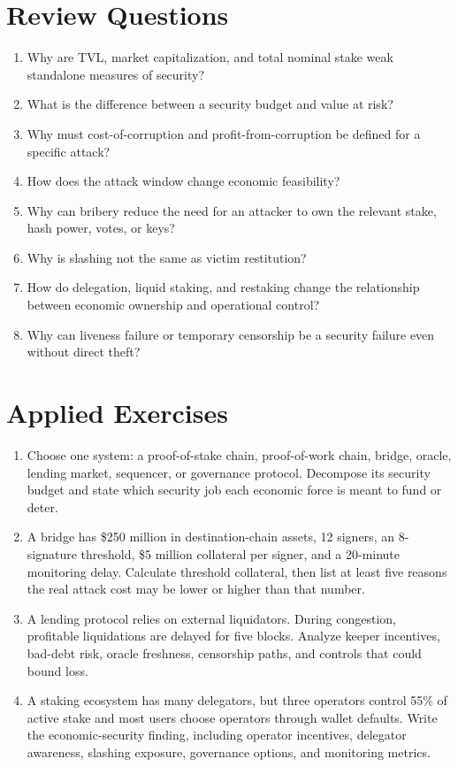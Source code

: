 \section*{Review Questions}

\begin{enumerate}
\item Why are TVL, market capitalization, and total nominal stake weak standalone measures of security?
\item What is the difference between a security budget and value at risk?
\item Why must cost-of-corruption and profit-from-corruption be defined for a specific attack?
\item How does the attack window change economic feasibility?
\item Why can bribery reduce the need for an attacker to own the relevant stake, hash power, votes, or keys?
\item Why is slashing not the same as victim restitution?
\item How do delegation, liquid staking, and restaking change the relationship between economic ownership and operational control?
\item Why can liveness failure or temporary censorship be a security failure even without direct theft?
\end{enumerate}

\section*{Applied Exercises}

\begin{enumerate}
\item Choose one system: a proof-of-stake chain, proof-of-work chain, bridge, oracle, lending market, sequencer, or governance protocol. Decompose its security budget and state which security job each economic force is meant to fund or deter.

\item A bridge has \$250 million in destination-chain assets, 12 signers, an 8-signature threshold, \$5 million collateral per signer, and a 20-minute monitoring delay. Calculate threshold collateral, then list at least five reasons the real attack cost may be lower or higher than that number.

\item A lending protocol relies on external liquidators. During congestion, profitable liquidations are delayed for five blocks. Analyze keeper incentives, bad-debt risk, oracle freshness, censorship paths, and controls that could bound loss.

\item A staking ecosystem has many delegators, but three operators control 55\% of active stake and most users choose operators through wallet defaults. Write the economic-security finding, including operator incentives, delegator awareness, slashing exposure, governance options, and monitoring metrics.
\end{enumerate}

